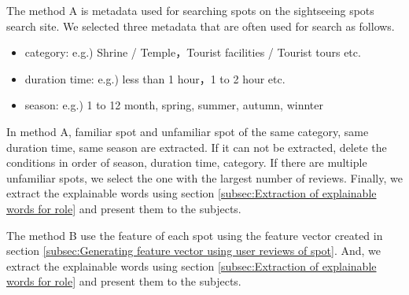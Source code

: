 \documentclass[journal]{IAENGtran}
\begin{document}
The method A is metadata used for searching spots on the sightseeing spots search site.
We selected three metadata that are often used for search as follows.
\begin{itemize}
\item category: e.g.) Shrine / Temple，Tourist facilities / Tourist tours etc.
\item duration time: e.g.) less than 1 hour，1 to 2 hour etc.
\item season: e.g.) 1 to 12 month, spring, summer, autumn, winnter
\end{itemize}
In method A, familiar spot and unfamiliar spot of the same category, same duration time, same season are extracted.
If it can not be extracted, delete the conditions in order of season, duration time, category.
If there are multiple unfamiliar spots, we select the one with the largest number of reviews.
Finally, we extract the explainable words using section \ref{subsec:Extraction of explainable words for role} and present them to the subjects.

The method B use the feature of each spot using the feature vector created in section \ref{subsec:Generating feature vector using user reviews of spot}.
And, we extract the explainable words using section \ref{subsec:Extraction of explainable words for role} and present them to the subjects.
\end{document}
